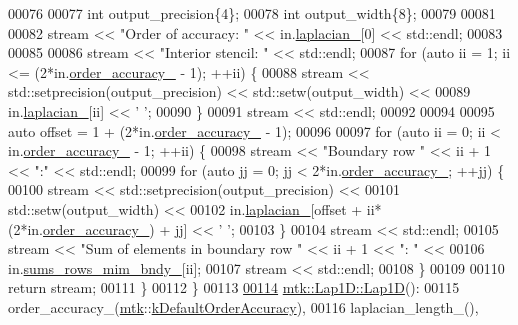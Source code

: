 \begin{DoxyCode}
00076 
00077   \textcolor{keywordtype}{int} output\_precision\{4\};
00078   \textcolor{keywordtype}{int} output\_width\{8\};
00079 
00081 
00082   stream << \textcolor{stringliteral}{"Order of accuracy: "} << in.\hyperlink{classmtk_1_1Lap1D_a64a3977527c00b4ef994d1bd549f82fd}{laplacian\_}[0] << std::endl;
00083 
00085 
00086   stream << \textcolor{stringliteral}{"Interior stencil: "} << std::endl;
00087   \textcolor{keywordflow}{for} (\textcolor{keyword}{auto} ii = 1; ii <= (2*in.\hyperlink{classmtk_1_1Lap1D_a35d34c085b9cf6f9961a699dfb02fea6}{order\_accuracy\_} - 1); ++ii) \{
00088     stream << std::setprecision(output\_precision) << std::setw(output\_width) <<
00089       in.\hyperlink{classmtk_1_1Lap1D_a64a3977527c00b4ef994d1bd549f82fd}{laplacian\_}[ii] << \textcolor{charliteral}{' '};
00090   \}
00091   stream << std::endl;
00092 
00094 
00095   \textcolor{keyword}{auto} offset = 1 + (2*in.\hyperlink{classmtk_1_1Lap1D_a35d34c085b9cf6f9961a699dfb02fea6}{order\_accuracy\_} - 1);
00096 
00097   \textcolor{keywordflow}{for} (\textcolor{keyword}{auto} ii = 0; ii < in.\hyperlink{classmtk_1_1Lap1D_a35d34c085b9cf6f9961a699dfb02fea6}{order\_accuracy\_} - 1; ++ii) \{
00098     stream << \textcolor{stringliteral}{"Boundary row "} << ii + 1 << \textcolor{stringliteral}{":"} << std::endl;
00099     \textcolor{keywordflow}{for} (\textcolor{keyword}{auto} jj = 0; jj < 2*in.\hyperlink{classmtk_1_1Lap1D_a35d34c085b9cf6f9961a699dfb02fea6}{order\_accuracy\_}; ++jj) \{
00100       stream << std::setprecision(output\_precision) <<
00101         std::setw(output\_width) <<
00102           in.\hyperlink{classmtk_1_1Lap1D_a64a3977527c00b4ef994d1bd549f82fd}{laplacian\_}[offset + ii*(2*in.\hyperlink{classmtk_1_1Lap1D_a35d34c085b9cf6f9961a699dfb02fea6}{order\_accuracy\_}) + jj] << \textcolor{charliteral}{' '};
00103     \}
00104     stream << std::endl;
00105     stream << \textcolor{stringliteral}{"Sum of elements in boundary row "} << ii + 1 << \textcolor{stringliteral}{": "} <<
00106       in.\hyperlink{classmtk_1_1Lap1D_a81d34a48cead4d5a2358581b1ff44252}{sums\_rows\_mim\_bndy\_}[ii];
00107     stream << std::endl;
00108   \}
00109 
00110   \textcolor{keywordflow}{return} stream;
00111 \}
00112 \}
00113 
\hypertarget{mtk__lap__1d_8cc_source_l00114}{}\hyperlink{classmtk_1_1Lap1D_a6fc2aeea35d4dfa49f17e625411f5a70}{00114} \hyperlink{classmtk_1_1Lap1D_a6fc2aeea35d4dfa49f17e625411f5a70}{mtk::Lap1D::Lap1D}():
00115   order\_accuracy\_(\hyperlink{namespacemtk}{mtk}::\hyperlink{group__c01-roots_ga0d95560098eb36420511103637b6952f}{kDefaultOrderAccuracy}),
00116   laplacian\_length\_(),

\end{DoxyCode}
